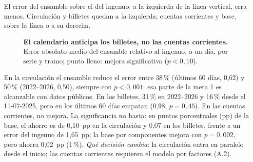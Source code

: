  El error del ensamble sobre el del ingenuo: a la izquierda de la línea vertical, erra menos. Circulación y billetes quedan a la izquierda; cuentas corrientes y base, sobre la línea o a su derecha.

\begin{figure}[H]\centering
\caption{\textbf{El calendario anticipa los billetes, no las cuentas corrientes.} Error absoluto medio del ensamble relativo al ingenuo, a un día, por serie y tramo; punto lleno: mejora significativa ($p<0{,}10$).}\label{f:mae}
\end{figure}

 En la circulación el ensamble reduce el error entre 38\,\% (últimos 60 días, 0,62) y 50\,\% (2022--2026, 0,50), siempre con $p<0{,}001$: esa parte de la meta 1 es alcanzable con datos públicos. En los billetes, 31\,\% en 2022--2026 y 16\,\% desde el 11-07-2025, pero en los últimos 60 días empatan (0,98; $p=0{,}45$). En las cuentas corrientes, no mejora. La significancia no basta: en puntos porcentuales (pp) de la base, el ahorro es de 0,10~pp en la circulación y 0,07 en los billetes, frente a un error del ingenuo de 1,65~pp; la base por componentes mejora con $p=0{,}002$, pero ahorra 0,02~pp (1\,\%). \emph{Qué decisión cambia}: la circulación entra en paralelo desde el inicio; las cuentas corrientes requieren el modelo por factores (A.2).

